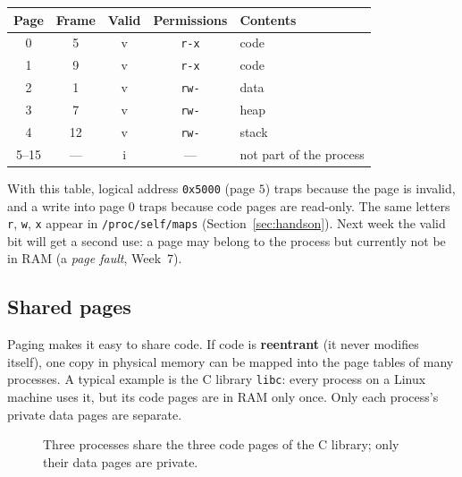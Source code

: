 \documentclass[11pt,a4paper]{article}
\newcommand{\term}[1]{\textbf{\color{mintdeep}#1}}
\begin{document}
\begin{center}
\renewcommand{\arraystretch}{1.2}
\begin{tabular}{@{}ccccl@{}}
\toprule
\textbf{Page} & \textbf{Frame} & \textbf{Valid} & \textbf{Permissions} & \textbf{Contents} \\
\midrule
0 & 5 & v & \texttt{r-x} & code \\
1 & 9 & v & \texttt{r-x} & code \\
2 & 1 & v & \texttt{rw-} & data \\
3 & 7 & v & \texttt{rw-} & heap \\
4 & 12 & v & \texttt{rw-} & stack \\
5--15 & --- & i & --- & not part of the process \\
\bottomrule
\end{tabular}
\end{center}

With this table, logical address \texttt{0x5000} (page $5$) traps because the page is invalid, and a write into page $0$ traps because code pages are read-only. The same letters \texttt{r}, \texttt{w}, \texttt{x} appear in \texttt{/proc/self/maps} (Section~\ref{sec:handson}). Next week the valid bit will get a second use: a page may belong to the process but currently not be in RAM (a \emph{page fault}, Week~7).

\subsection{Shared pages}

Paging makes it easy to share code. If code is \term{reentrant} (it never modifies itself), one copy in physical memory can be mapped into the page tables of many processes. A typical example is the C library \texttt{libc}: every process on a Linux machine uses it, but its code pages are in RAM only once. Only each process's private data pages are separate.

\begin{figure}[H]
\centering
{}
\caption{Three processes share the three code pages of the C library; only their data pages are private.}
\end{figure}
\end{document}
